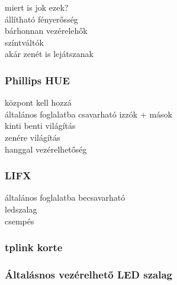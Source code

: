 \documentclass[../main.tex]{subfiles}
\begin{document}
        miert is jok ezek? \\
            állítható fényerősség\\
            bárhonnan vezérelehők\\
            színtváltók\\
            akár zenét is lejátszanak\\
            
        
        \subsubsection{Phillips HUE} %
            központ kell hozzá\\
            
            általános foglalatba csavarható izzók + mások\\
            kinti benti világítás\\
            zenére világítás\\
            hanggal vezérelhetőség\\
            
            
        \subsubsection{LIFX} 
            általános foglalatba becsavarható\\
            ledszalag\\
            csempés\\
        
        \subsubsection{tplink korte}%
            
        
        \subsubsection{Általásnos vezérelhető LED szalag}%
        
\end{document}

